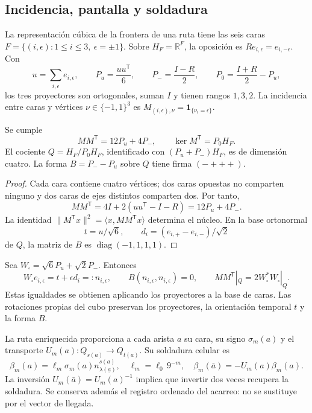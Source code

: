 \subsection{Incidencia, pantalla y soldadura}
\label{hmtcuatro:ant:pantalla}

La representación cúbica de la frontera de una ruta tiene las seis
caras \(F=\{(i,\epsilon):1\leq i\leq3,\ \epsilon=\pm1\}\).
Sobre \(H_F=\mathbb R^F\), la oposición es
\(Re_{i,\epsilon}=e_{i,-\epsilon}\). Con
\[
 u=\sum_{i,\epsilon}e_{i,\epsilon},\qquad
 P_u=\frac{uu^{\mathsf T}}6,\qquad
 P_-=\frac{I-R}2,\qquad
 P_0=\frac{I+R}2-P_u ,
\]
los tres proyectores son ortogonales, suman \(I\) y tienen rangos
\(1,3,2\). La incidencia entre caras y vértices
\(\nu\in\{-1,1\}^3\) es
\(M_{(i,\epsilon),\nu}=\mathbf1_{\{\nu_i=\epsilon\}}\).

\begin{proposition}
\label{hmtcuatro:ant:prop-pantalla}
Se cumple
\[
 MM^{\mathsf T}=12P_u+4P_-,\qquad
 \ker M^{\mathsf T}=P_0H_F .
\]
El cociente \(Q=H_F/P_0H_F\), identificado con
\((P_u+P_-)H_F\), es de dimensión cuatro. La forma
\(B=P_--P_u\) sobre \(Q\) tiene firma \((-+++)\).
\end{proposition}
\begin{proof}
Cada cara contiene cuatro vértices; dos caras opuestas no comparten
ninguno y dos caras de ejes distintos comparten dos. Por tanto,
\[
 MM^{\mathsf T}=4I+2(uu^{\mathsf T}-I-R)
              =12P_u+4P_- .
\]
La identidad
\(\|M^{\mathsf T}x\|^2=\langle x,MM^{\mathsf T}x\rangle\)
determina el núcleo. En la base ortonormal
\[
 t=u/\sqrt6,\qquad d_i=(e_{i,+}-e_{i,-})/\sqrt2
\]
de \(Q\), la matriz de \(B\) es \(\operatorname{diag}(-1,1,1,1)\).
\end{proof}

Sea \(W_\square=\sqrt6P_u+\sqrt2P_-\). Entonces
\[
 W_\square e_{i,\epsilon}=t+\epsilon d_i=:n_{i,\epsilon},
 \qquad B(n_{i,\epsilon},n_{i,\epsilon})=0,\qquad
 MM^{\mathsf T}|_Q=2W_\square^*W_\square|_Q .
\]
Estas igualdades se obtienen aplicando los proyectores a la base de
caras. Las rotaciones propias del cubo preservan los proyectores,
la orientación temporal \(t\) y la forma \(B\).

La ruta enriquecida proporciona a cada arista \(a\) su cara,
su signo \(\sigma_m(a)\) y el transporte
\(U_m(a):Q_{s(a)}\to Q_{t(a)}\). Su soldadura celular es
\begin{equation}
 \beta_m(a)=\ell_m\sigma_m(a)n_{\lambda(\underline a)}^{s(a)},
 \quad \ell_m=\ell_0\,9^{-m},\quad
 \beta_m(\bar a)=-U_m(a)\beta_m(a).
 \label{hmtcuatro:ant:soldadura}
\end{equation}
La inversión \(U_m(\bar a)=U_m(a)^{-1}\) implica que invertir dos
veces recupera la soldadura. Se conserva además el registro ordenado
del acarreo: no se sustituye por el vector de llegada.

